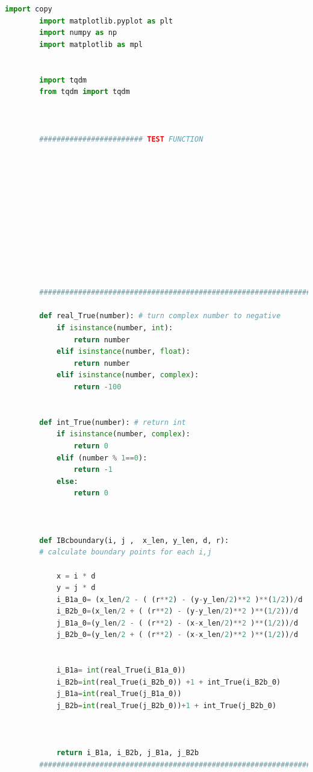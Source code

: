 \documentclass[12pt]{article}
\begin{document}
\begin{scriptsize}
    \begin{lstlisting}[language=python,caption={Python code-Potential Flow}]
        import copy 
        import matplotlib.pyplot as plt
        import numpy as np
        import matplotlib as mpl
        
        
        import tqdm
        from tqdm import tqdm
        
        
        
        ######################## TEST FUNCTION
        
        
        
        
        
        
        
        
        
        
        
        
        ##########################################################################################
        
        def real_True(number): # turn complex number to negative
            if isinstance(number, int):
                return number
            elif isinstance(number, float):
                return number
            elif isinstance(number, complex):
                return -100
        
            
        def int_True(number): # return int
            if isinstance(number, complex):
                return 0
            elif (number % 1==0):
                return -1
            else:
                return 0
            
        
        
        def IBcboundary(i, j ,  x_len, y_len, d, r): 
        # calculate boundary points for each i,j
            
            x = i * d
            y = j * d
            i_B1a_0= (x_len/2 - ( (r**2) - (y-y_len/2)**2 )**(1/2))/d
            i_B2b_0=(x_len/2 + ( (r**2) - (y-y_len/2)**2 )**(1/2))/d
            j_B1a_0=(y_len/2 - ( (r**2) - (x-x_len/2)**2 )**(1/2))/d
            j_B2b_0=(y_len/2 + ( (r**2) - (x-x_len/2)**2 )**(1/2))/d
        
        
            i_B1a= int(real_True(i_B1a_0)) 
            i_B2b=int(real_True(i_B2b_0)) +1 + int_True(i_B2b_0)
            j_B1a=int(real_True(j_B1a_0))
            j_B2b=int(real_True(j_B2b_0))+1 + int_True(j_B2b_0)
        
        
        
            return i_B1a, i_B2b, j_B1a, j_B2b
        ##########################################################################################
        

\end{lstlisting}
\end{scriptsize}
\end{document}
